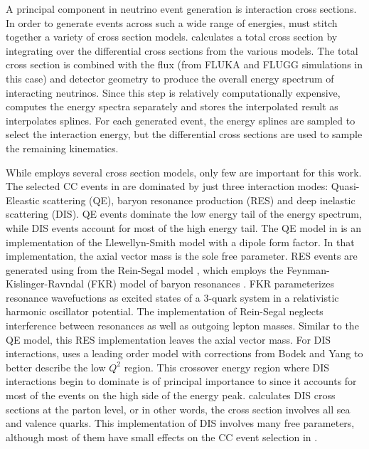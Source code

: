 A principal component in neutrino event generation is interaction cross sections.  In order to generate events across such a wide range of energies, \genie must stitch together a variety of cross section models.  \genie calculates a total cross section by integrating over the differential cross sections from the various models.  The total cross section is combined with the flux (from FLUKA and FLUGG simulations in this case) and detector geometry to produce the overall energy spectrum of interacting neutrinos.  Since this step is relatively computationally expensive, \genie computes the energy spectra separately and stores the interpolated result as interpolates splines.  For each generated event, the energy splines are sampled to select the interaction energy, but the differential cross sections are used to sample the remaining kinematics.


While \genie employs several cross section models, only few are important for this work.  The selected \numu CC events in \nova are dominated by just three interaction modes: Quasi-Eleastic scattering (QE),  baryon resonance production (RES) and deep inelastic scattering (DIS).  QE events dominate the low energy tail of the energy spectrum, while DIS events account for most of the high energy tail.  The QE model in \genie is an implementation of the Llewellyn-Smith model \cite{LlewellynSmith} with a dipole form factor.  In that implementation, the axial vector mass is the sole free parameter.  RES events are generated using from the Rein-Segal model \cite{rein1981neutrino}, which employs the Feynman-Kislinger-Ravndal (FKR) model of baryon resonances \cite{feynman1971current}.  FKR parameterizes resonance wavefuctions as excited states of a 3-quark system in a relativistic harmonic oscillator potential.  The \genie implementation of Rein-Segal neglects interference between resonances as well as outgoing lepton masses.  Similar to the QE model, this RES implementation leaves the axial vector mass.  For DIS interactions, \genie uses a leading order model with corrections from Bodek and Yang \cite{bodek2003higher} to better describe the low $Q^2$ region.  This crossover energy region where DIS interactions begin to dominate is of principal importance to \nova since it accounts for most of the events on the high side of the energy peak.  \genie calculates DIS cross sections at the parton level, or in other words, the cross section involves all sea and valence quarks.  This implementation of DIS involves many free parameters, although most of them have small effects on the \numu CC event selection in \nova.

